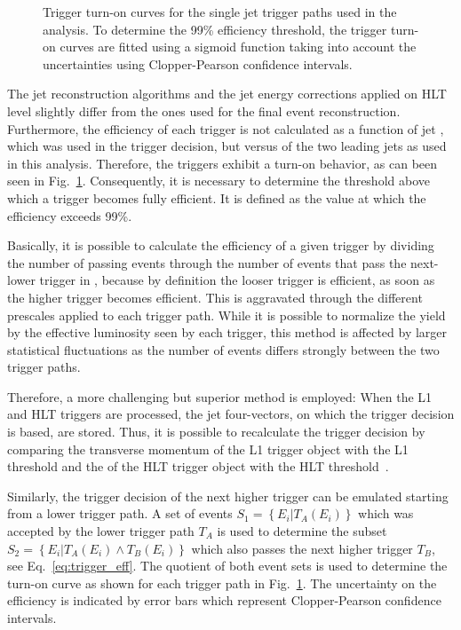 \begin{figure}[htbp]
    \caption[Turn-on curves of single jet HLT trigger paths]{Trigger turn-on curves for the single jet trigger
    paths used in the analysis. To determine the 99\% efficiency threshold, the
    trigger turn-on curves are fitted using a sigmoid function taking into account the
    uncertainties using Clopper-Pearson confidence intervals.}
    \label{fig:trigger_eff}
\end{figure}

The jet reconstruction algorithms and the jet energy corrections applied on HLT
level slightly differ from the ones used for the final event reconstruction.
Furthermore, the efficiency of each trigger is not calculated as a function of
jet \pt, which was used in the trigger decision, but versus \ptavg of the two
leading jets as used in this analysis. Therefore, the triggers exhibit a turn-on
behavior, as can been seen in Fig.~\ref{fig:trigger_eff}. Consequently, it is
necessary to determine the threshold above which a trigger becomes fully
efficient. It is defined as the value at which the efficiency exceeds 99\%.

Basically, it is possible to calculate the efficiency of a given trigger by
dividing the number of passing events through the number of events that pass
the next-lower trigger in \pt, because by definition the looser trigger is efficient,
as soon as the higher trigger becomes efficient. This is aggravated through the
different prescales applied to each trigger path. While it is possible to
normalize the yield by the effective luminosity seen by each trigger, this
method is affected by larger statistical fluctuations as the number of events
differs strongly between the two trigger paths.

Therefore, a more challenging but superior method is employed: When the L1
and HLT triggers are processed, the jet four-vectors, on
which the trigger decision is based, are stored. Thus, it is possible to
recalculate the trigger decision by comparing the transverse momentum of the L1
trigger object with the L1 threshold and the \pt of the HLT trigger object with
the HLT threshold~\cite{Stober:2012abc}.

Similarly, the trigger decision of the next higher trigger can be emulated
starting from a lower trigger path. A set of events $S_1 = \left\{E_i | T_A
(E_i)\right\}$ which was accepted  by the lower trigger path $T_A$ is
used to determine the subset $S_2 = \left\{E_i|T_A(E_i) \wedge  T_B(E_i)
\right\}$ which also passes the next higher trigger $T_B$, see
Eq.~\ref{eq:trigger_eff}. The quotient of both event sets is used to determine
the turn-on curve as shown for each trigger path in Fig.~\ref{fig:trigger_eff}. 
The uncertainty on the efficiency is
indicated by error bars which represent Clopper-Pearson confidence intervals.

